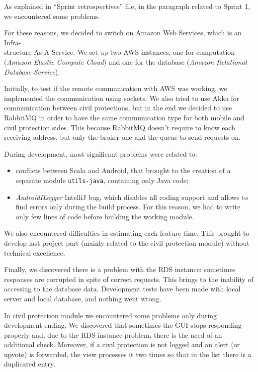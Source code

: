 \documentclass[a4paper,12pt]{report}
\begin{document}
As explained in ``Sprint retrospectives'' file, in the paragraph related to Sprint 1, we encountered some problems.

For these reasons, we decided to switch on Amazon Web Services, which is an Infra-\\structure-As-A-Service. We set up two AWS instances, one for computation (\textit{Amazon Elastic Compute Cloud}) and one for the database (\textit{Amazon Relational Database Service}).

Initially, to test if the remote communication with AWS was working, we implemented the communication using sockets. We also tried to use Akka for communication between civil protections, but in the end we decided to use RabbitMQ in order to have the same communication type for both mobile and civil protection sides. This because RabbitMQ doesn't require to know each receiving address, but only the broker one and the queue to send requests on.

During development, most significant problems were related to:

\begin{itemize}
\item conflicts between Scala and Android, that brought to the creation of a separate module \texttt{utils-java}, containing only Java code;
\item \textit{AndroidILogger} IntelliJ bug, which disables all coding support and allows to find errors only during the build process. For this reason, we had to write only few lines of code before building the working module.
\end{itemize}

We also encountered difficulties in estimating each feature time. This brought to develop last project part (mainly related to the civil protection module) without technical excellence.

Finally, we discovered there is a problem with the RDS instance: sometimes responses are corrupted in spite of correct requests. This brings to the inability of accessing to the database data.
Development tests have been made with local server and local database, and nothing went wrong.

In civil protection module we encountered some problems only during development ending. We discovered that sometimes the GUI stops responding properly and, due to the RDS instance problem, there is the need of an additional check.
Moreover, if a civil protection is not logged and an alert (or upvote) is forwarded, the view processes it two times so that in the list there is a duplicated entry. 
\end{document}
